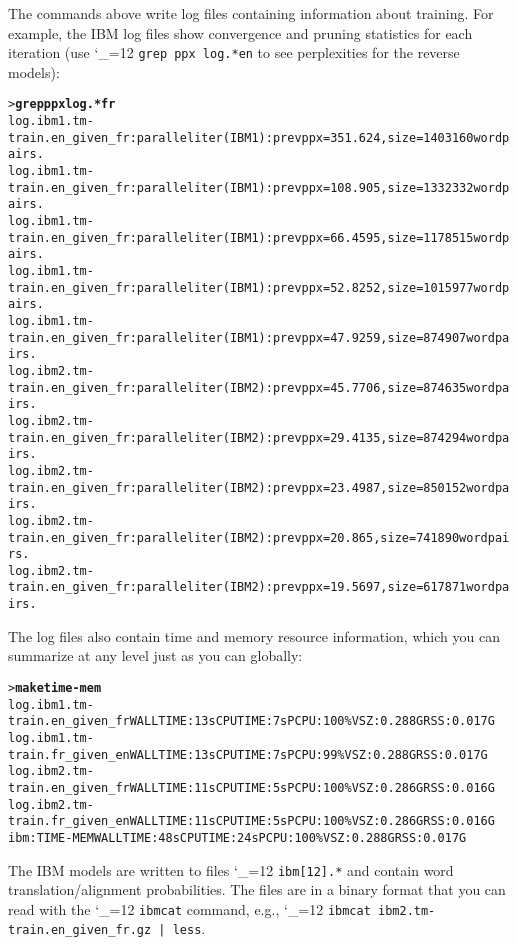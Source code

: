\documentclass[11pt,letterpaper]{article}
\def\code{\begingroup\catcode`\_=12 \codex}
\newcommand{\codex}[1]{\texttt{#1}\endgroup}
\begin{document}
The commands above write log files containing information about training.  For
example, the IBM log files show convergence and pruning statistics for each
iteration (use \code{grep ppx log.*en} to see perplexities for the reverse models):
\begin{footnotesize}
\begin{alltt}
   > \textbf{grep ppx log.*fr}
   log.ibm1.tm-train.en_given_fr:parallel iter (IBM1): prev ppx = 351.624, size = 1403160 word pairs.
   log.ibm1.tm-train.en_given_fr:parallel iter (IBM1): prev ppx = 108.905, size = 1332332 word pairs.
   log.ibm1.tm-train.en_given_fr:parallel iter (IBM1): prev ppx = 66.4595, size = 1178515 word pairs.
   log.ibm1.tm-train.en_given_fr:parallel iter (IBM1): prev ppx = 52.8252, size = 1015977 word pairs.
   log.ibm1.tm-train.en_given_fr:parallel iter (IBM1): prev ppx = 47.9259, size = 874907 word pairs.
   log.ibm2.tm-train.en_given_fr:parallel iter (IBM2): prev ppx = 45.7706, size = 874635 word pairs.
   log.ibm2.tm-train.en_given_fr:parallel iter (IBM2): prev ppx = 29.4135, size = 874294 word pairs.
   log.ibm2.tm-train.en_given_fr:parallel iter (IBM2): prev ppx = 23.4987, size = 850152 word pairs.
   log.ibm2.tm-train.en_given_fr:parallel iter (IBM2): prev ppx = 20.865, size = 741890 word pairs.
   log.ibm2.tm-train.en_given_fr:parallel iter (IBM2): prev ppx = 19.5697, size = 617871 word pairs.
\end{alltt}
\end{footnotesize}

The log files also contain time and memory resource information, which you can
summarize at any level just as you can globally:
\begin{footnotesize}
\begin{alltt}
   > \textbf{make time-mem}
     log.ibm1.tm-train.en_given_fr  WALL TIME: 13s  CPU TIME: 7s   PCPU: 100\%  VSZ: 0.288G  RSS: 0.017G
     log.ibm1.tm-train.fr_given_en  WALL TIME: 13s  CPU TIME: 7s   PCPU: 99\%   VSZ: 0.288G  RSS: 0.017G
     log.ibm2.tm-train.en_given_fr  WALL TIME: 11s  CPU TIME: 5s   PCPU: 100\%  VSZ: 0.286G  RSS: 0.016G
     log.ibm2.tm-train.fr_given_en  WALL TIME: 11s  CPU TIME: 5s   PCPU: 100\%  VSZ: 0.286G  RSS: 0.016G
   ibm:TIME-MEM                     WALL TIME: 48s  CPU TIME: 24s  PCPU: 100\%  VSZ: 0.288G  RSS: 0.017G
\end{alltt}
\end{footnotesize}

The IBM models are written to files \code{ibm[12].*} and contain word
translation/alignment probabilities.
The files are in a binary format that you can read with the \code{ibmcat} command,
e.g., \code{ibmcat ibm2.tm-train.en_given_fr.gz | less}.
\end{document}
